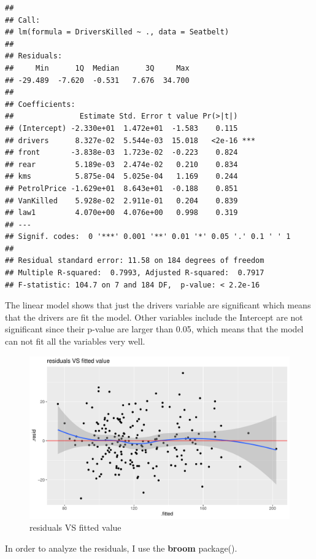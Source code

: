\documentclass[11pt,a4paper,]{article}
\begin{document}
\begin{verbatim}
## 
## Call:
## lm(formula = DriversKilled ~ ., data = Seatbelt)
## 
## Residuals:
##     Min      1Q  Median      3Q     Max 
## -29.489  -7.620  -0.531   7.676  34.700 
## 
## Coefficients:
##               Estimate Std. Error t value Pr(>|t|)    
## (Intercept) -2.330e+01  1.472e+01  -1.583    0.115    
## drivers      8.327e-02  5.544e-03  15.018   <2e-16 ***
## front       -3.838e-03  1.723e-02  -0.223    0.824    
## rear         5.189e-03  2.474e-02   0.210    0.834    
## kms          5.875e-04  5.025e-04   1.169    0.244    
## PetrolPrice -1.629e+01  8.643e+01  -0.188    0.851    
## VanKilled    5.928e-02  2.911e-01   0.204    0.839    
## law1         4.070e+00  4.076e+00   0.998    0.319    
## ---
## Signif. codes:  0 '***' 0.001 '**' 0.01 '*' 0.05 '.' 0.1 ' ' 1
## 
## Residual standard error: 11.58 on 184 degrees of freedom
## Multiple R-squared:  0.7993, Adjusted R-squared:  0.7917 
## F-statistic: 104.7 on 7 and 184 DF,  p-value: < 2.2e-16
\end{verbatim}

The linear model shows that just the drivers variable are significant which means that the drivers are fit the model. Other variables include the Intercept are not significant since their p-value are larger than 0.05, which means that the model can not fit all the variables very well.

\clearpage

\begin{figure}
\centering
\includegraphics{report_files/figure-latex/redsduals-1.pdf}
\caption{\label{fig:redsduals}residuals VS fitted value}
\end{figure}

In order to analyze the residuals, I use the \textbf{broom} package(\cite{11}).
\end{document}
